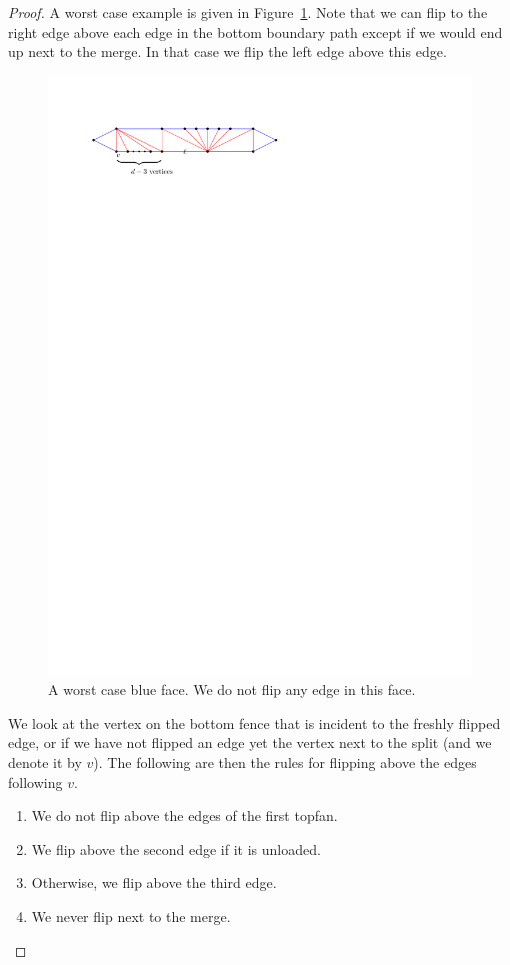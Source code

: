   \begin{proof}
  A worst case example is given in Figure~\ref{fig:subdiv:worstCaseWithTopFan}.
  Note that we can flip to the right edge above each edge in the bottom boundary path except if we would end up next to the merge.
  In that case we flip the left edge above this edge.

  \begin{figure}[b]
    \centering
    \includegraphics[scale=1]{blueFaceSubdivision/img/worstCaseWithTopFan}
    \caption{A worst case blue face. We do not flip any edge in this face.}
    \label{fig:subdiv:worstCaseWithTopFan}
  \end{figure}

  We look at the vertex on the bottom fence that is incident to the freshly flipped edge, or if we have not flipped an edge yet the vertex next to the split (and we denote it by $v$). The following are then the rules for flipping above the edges following $v$.
  \begin{enumerate}
    \item We do not flip above the edges of the first topfan.
    \item We flip above the second edge if it is unloaded.
    \item Otherwise, we flip above the third edge.
    \item We never flip next to the merge.
  \end{enumerate}


\end{proof}
